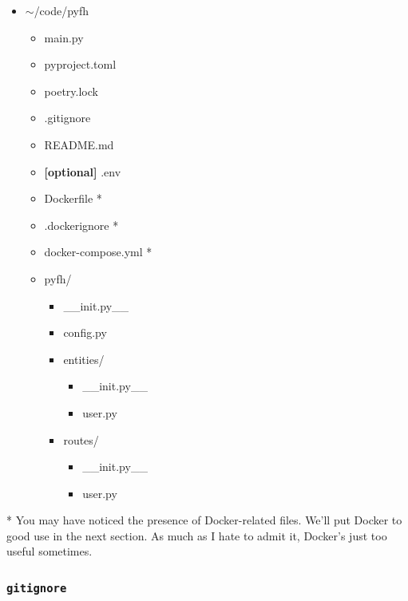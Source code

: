 \documentclass{article}
\newcommand{\optional}{{\rmfamily\bfseries\color{gray} [optional] }}
\begin{document}
{\ttfamily
\begin{itemize}
    \item $\sim$/code/pyfh
        \begin{itemize}
            \item main.py
            \item pyproject.toml
            \item poetry.lock
            \item .gitignore
            \item README.md
            \item \optional .env
            \item Dockerfile *
            \item .dockerignore *
            \item docker-compose.yml *
            \item pyfh/
                \begin{itemize}
                    \item \_\_init.py\_\_
                    \item config.py
                    \item entities/
                        \begin{itemize}
                            \item \_\_init.py\_\_
                            \item user.py
                        \end{itemize}
                    \item{routes/}
                        \begin{itemize}
                            \item \_\_init.py\_\_
                            \item user.py
                        \end{itemize}
                \end{itemize}
        \end{itemize}
\end{itemize}
}

* You may have noticed the presence of Docker-related files. We'll put Docker to good use in the next section. As much as I hate to admit it, Docker's just too useful sometimes.

\subsubsection{\texttt{gitignore}}
\end{document}
